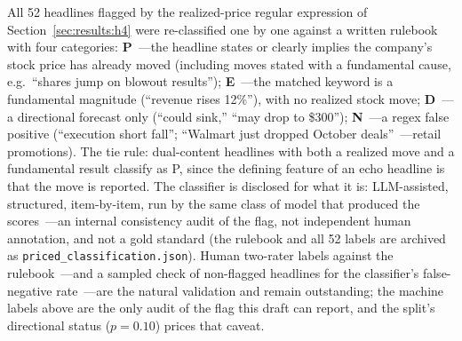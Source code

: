 All 52 headlines flagged by the realized-price regular expression of Section~\ref{sec:results:h4} were re-classified one by one against a written rulebook with four categories: \textbf{P}~---the headline states or clearly implies the company's stock price has already moved (including moves stated with a fundamental cause, e.g.\ ``shares jump on blowout results''); \textbf{E}~---the matched keyword is a fundamental magnitude (``revenue rises 12\%''), with no realized stock move; \textbf{D}~---a directional forecast only (``could sink,'' ``may drop to \$300''); \textbf{N}~---a regex false positive (``execution short fall''; ``Walmart just dropped October deals''~---retail promotions). The tie rule: dual-content headlines with both a realized move and a fundamental result classify as P, since the defining feature of an echo headline is that the move is reported. The classifier is disclosed for what it is: LLM-assisted, structured, item-by-item, run by the same class of model that produced the scores~---an internal consistency audit of the flag, not independent human annotation, and not a gold standard (the rulebook and all 52 labels are archived as \texttt{priced\_classification.json}). Human two-rater labels against the rulebook~---and a sampled check of non-flagged headlines for the classifier's false-negative rate~---are the natural validation and remain outstanding; the machine labels above are the only audit of the flag this draft can report, and the split's directional status ($p=0.10$) prices that caveat.

